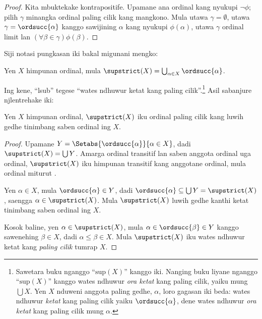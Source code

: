 \documentclass[../../../include/open-logic-section]{subfiles}
\begin{document}
\begin{proof}
Kita mbuktekake kontrapositife. Upamane ana ordinal
kang nyukupi $\lnot\phi$; pilih $\gamma$ minangka
ordinal paling cilik kang mangkono. Mula utawa
$\gamma = \emptyset$, utawa
$\gamma = \ordsucc{\alpha}$ kanggo sawijining
$\alpha$ kang nyukupi $\phi(\alpha)$, utawa
$\gamma$ ordinal limit lan
$(\forall \beta \in \gamma)\phi(\beta)$.
\end{proof}
\noindent
Siji notasi pungkasan iki bakal migunani mengko:

\begin{defn}
Yen $X$ himpunan ordinal, mula
$\supstrict(X) = \bigcup_{\alpha \in X}
\ordsucc{\alpha}$.
\end{defn}
\noindent
Ing kene, ``lsub'' tegese ``wates ndhuwur ketat kang
paling cilik''.\footnote{Sawetara buku nganggo
``$\text{sup}(X)$'' kanggo iki. Nanging buku liyane
nganggo ``$\text{sup}(X)$'' kanggo wates ndhuwur
\emph{ora ketat} kang paling cilik, yaiku mung
$\bigcup X$. Yen $X$ nduweni anggota paling gedhe,
$\alpha$, loro gagasan iki beda: wates ndhuwur
\emph{ketat} kang paling cilik yaiku
$\ordsucc{\alpha}$, dene wates ndhuwur
\emph{ora ketat} kang paling cilik mung $\alpha$.}
Asil sabanjure njlentrehake iki:

\begin{prop}
Yen $X$ himpunan ordinal, $\supstrict(X)$ iku
ordinal paling cilik kang luwih gedhe tinimbang
saben ordinal ing $X$.
\end{prop}

\begin{proof}
Upamane $Y = \Setabs{\ordsucc{\alpha}}{\alpha \in X}$,
dadi $\supstrict(X) = \bigcup Y$. Amarga ordinal
transitif lan saben anggota ordinal uga ordinal,
$\supstrict(X)$ iku himpunan transitif kang anggotane
ordinal, mula ordinal miturut
.

Yen $\alpha \in X$, mula $\ordsucc{\alpha} \in Y$,
dadi $\ordsucc{\alpha} \subseteq \bigcup Y
= \supstrict(X)$, saengga
$\alpha \in \supstrict(X)$. Mula $\supstrict(X)$
luwih gedhe kanthi ketat tinimbang saben ordinal
ing $X$.

Kosok baline, yen $\alpha \in \supstrict(X)$,
mula $\alpha \in \ordsucc{\beta} \in Y$ kanggo
sawenehing $\beta \in X$, dadi $\alpha \leq
\beta \in X$. Mula $\supstrict(X)$ iku wates ndhuwur ketat
kang \emph{paling cilik} tumrap $X$.
\end{proof}
\end{document}
